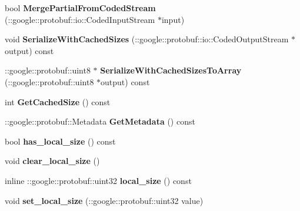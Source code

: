\begin{DoxyCompactItemize}
bool {\bfseries Merge\+Partial\+From\+Coded\+Stream} (\+::google\+::protobuf\+::io\+::\+Coded\+Input\+Stream $\ast$input)
\item 
\mbox{\label{classcaffe_1_1_l_r_n_parameter_a7fc4d521c9d9e029715bd32465113705}} 
void {\bfseries Serialize\+With\+Cached\+Sizes} (\+::google\+::protobuf\+::io\+::\+Coded\+Output\+Stream $\ast$output) const
\item 
\mbox{\label{classcaffe_1_1_l_r_n_parameter_a4062aae3de103a4c1459c30da75b6777}} 
\+::google\+::protobuf\+::uint8 $\ast$ {\bfseries Serialize\+With\+Cached\+Sizes\+To\+Array} (\+::google\+::protobuf\+::uint8 $\ast$output) const
\item 
\mbox{\label{classcaffe_1_1_l_r_n_parameter_a9ce2131a863ba06b223c6a2b68b39e4b}} 
int {\bfseries Get\+Cached\+Size} () const
\item 
\mbox{\label{classcaffe_1_1_l_r_n_parameter_a4c1cf156dbd9d4f5dcd406ce68653298}} 
\+::google\+::protobuf\+::\+Metadata {\bfseries Get\+Metadata} () const
\item 
\mbox{\label{classcaffe_1_1_l_r_n_parameter_a3af2d77147a65168f53b9715226eb1f8}} 
bool {\bfseries has\+\_\+local\+\_\+size} () const
\item 
\mbox{\label{classcaffe_1_1_l_r_n_parameter_af815e75803262e3cb242ef7db94304cd}} 
void {\bfseries clear\+\_\+local\+\_\+size} ()
\item 
\mbox{\label{classcaffe_1_1_l_r_n_parameter_a12dc2febc9b0b58cf44dc226f16de9f1}} 
inline \+::google\+::protobuf\+::uint32 {\bfseries local\+\_\+size} () const
\item 
\mbox{\label{classcaffe_1_1_l_r_n_parameter_adfdadcec35037f68c65a757c2cc45515}} 
void {\bfseries set\+\_\+local\+\_\+size} (\+::google\+::protobuf\+::uint32 value)
\item 
\mbox{\label{classcaffe_1_1_l_r_n_parameter_acb149d6b0d09be0cf2c50727ffc2b01d}} 

\end{DoxyCompactItemize}
